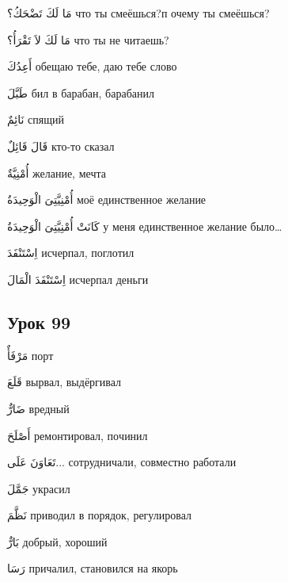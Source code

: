 \documentclass[a5paper]{article}
\newcommand\textstyleDropCaps[1]{#1}
\newcommand\textstyleCaptioncharacters[1]{#1}
\begin{document}
\textstyleCaptioncharacters{مَا لَكَ تَضْحَكُ؟ }\textstyleDropCaps{что ты смеёшься?п очему ты смеёшься?‎}

\textstyleCaptioncharacters{مَا لَكَ لاَ تَقْرَأُ؟ }\textstyleDropCaps{что ты не читаешь?‎}

\textstyleCaptioncharacters{أَعِدُكَ }\textstyleDropCaps{обещаю тебе, даю тебе слово‎}

\textstyleCaptioncharacters{طَبَّلَ }\textstyleDropCaps{бил в барабан, бара­банил‎}

\textstyleCaptioncharacters{نَائِمٌ }\textstyleDropCaps{спящий‎}

\textstyleCaptioncharacters{قَالَ قَائِلٌ }\textstyleDropCaps{кто-то сказал‎}

\textstyleCaptioncharacters{أُمْنِيَّةٌ }\textstyleDropCaps{желание, мечта‎}

\textstyleCaptioncharacters{أُمْنِيَّتِىَ الْوَحِيدَةُ }\textstyleDropCaps{моё единственное желание‎}

\textstyleCaptioncharacters{كَانَتْ أُمْنِيَّتِىَ الْوَحِيدَةُ }\textstyleDropCaps{у меня единственное желание было…‎}

\textstyleCaptioncharacters{اِسْتَنْفَدَ }\textstyleDropCaps{исчерпал, погло­тил‎}

\textstyleCaptioncharacters{اِسْتَنْفَدَ الْمَالَ }\textstyleDropCaps{исчер­пал деньги‎}

\subsection[Урок 99‎]{\textstyleDropCaps{Урок 99‎}}
\textstyleCaptioncharacters{مَرْفَأٌ }\textstyleDropCaps{порт‎}

\textstyleCaptioncharacters{قَلَعَ }\textstyleDropCaps{вырвал, выдёргивал‎}

\textstyleCaptioncharacters{ضَارٌّ }\textstyleDropCaps{вредный‎}

\textstyleCaptioncharacters{أَصْلَحَ }\textstyleDropCaps{ремонтировал, по­чинил‎}

\textstyleCaptioncharacters{تَعَاوَنَ عَلَى... }\textstyleDropCaps{сотрудни­чали, совместно работали‎}

\textstyleCaptioncharacters{جَمَّلَ }\textstyleDropCaps{украсил‎}

\textstyleCaptioncharacters{نَظَّمَ }\textstyleDropCaps{приводил в порядок, регулировал‎}

\textstyleCaptioncharacters{بَارٌّ }\textstyleDropCaps{добрый, хороший‎}

\textstyleCaptioncharacters{رَسَا }\textstyleDropCaps{причалил, становился на якорь‎}
\end{document}

